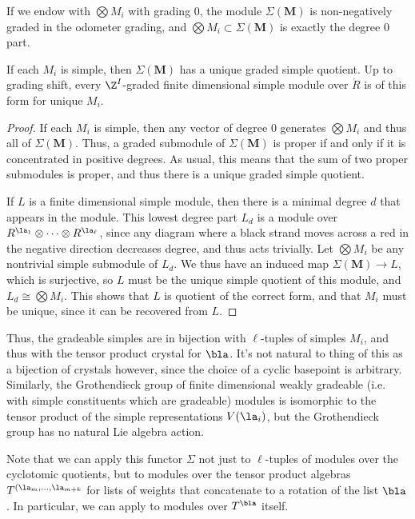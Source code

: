 If we endow with $\bigotimes M_i$ with grading 0, the module $\Sigma(\mathbf{M})$ is non-negatively graded in the odometer grading, and $\bigotimes M_i\subset \Sigma(\mathbf{M})$ is exactly the degree 0 part.
\begin{theorem}
If each $M_i$ is simple, then $\Sigma(\mathbf{M})$ has a unique graded simple quotient.  Up to grading shift, every  $\Z^I$-graded finite dimensional simple module over $\mathring{R}$ is of this form for unique $M_i$.  
\end{theorem}
\begin{proof}
If each $M_i$ is simple, then any vector of degree 0 generates $ \bigotimes M_i$ and thus all of $\Sigma(\mathbf{M})$.  Thus, a graded submodule of $\Sigma(\mathbf{M})$ is proper if and only if it is concentrated in positive degrees.  As usual, this means that the sum of two proper submodules is proper, and thus there is a unique graded simple quotient.  

If $L$ is a finite dimensional simple module, then there is a minimal degree $d$ that appears in the module.  This lowest degree part $L_d$ is a module over $R^{\la_1}\otimes \cdots \otimes R^{\la_\ell}$, since any diagram where a black strand moves across a red in the negative direction decreases degree, and thus acts trivially.  Let $\bigotimes M_i$ be any nontrivial simple submodule of $L_d$.  We thus have an induced map $\Sigma(\mathbf{M})\to L$, which is surjective, so $L$ must be the unique simple quotient of this module, and $L_d\cong \bigotimes M_i$.  This shows that $L$ is quotient of the correct form, and that $M_i$ must be unique, since it can be recovered from $L$.
\end{proof}

Thus, the gradeable simples are in bijection with $\ell$-tuples of simples $M_i$, and thus with the tensor product crystal for $\bla$.  It's not natural to thing of this as a bijection of crystals however, since the choice of a cyclic basepoint is arbitrary.  Similarly, the Grothendieck group of finite dimensional weakly gradeable (i.e. with simple constituents which are gradeable) modules is isomorphic to the tensor product of the simple representations $V(\la_i)$, but the Grothendieck group has no natural Lie algebra action.  

Note that we can apply this functor $\Sigma$ not just to $\ell$-tuples of modules over the cyclotomic quotients, but to modules over the tensor product algebras $T^{(\la_{m},\dots, \la_{m+k}}$ for lists of weights that concatenate to a rotation of the list $\bla$.  In particular, we can apply to modules over $T^\bla$ itself. 

